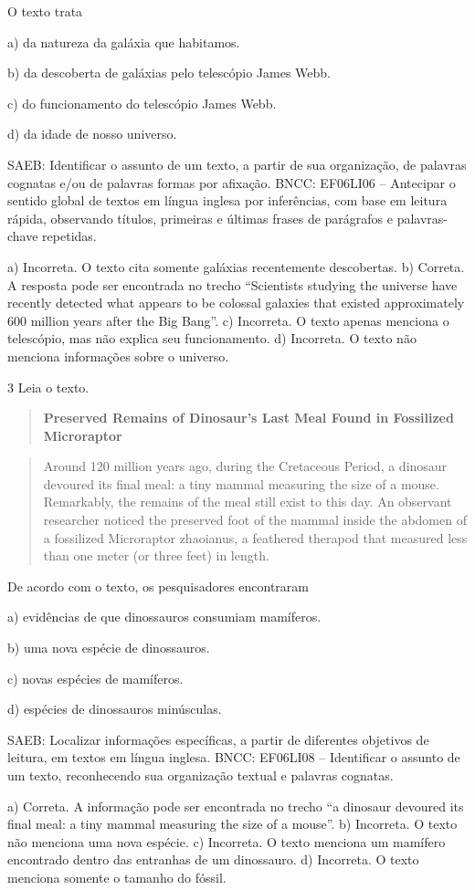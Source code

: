 O texto trata

a) da natureza da galáxia que habitamos.

b) da descoberta de galáxias pelo telescópio James Webb.

c) do funcionamento do telescópio James Webb.

d) da idade de nosso universo.

SAEB: Identificar o assunto de um texto, a partir de sua organização, de
palavras cognatas e/ou de palavras formas por afixação. BNCC: EF06LI06
-- Antecipar o sentido global de textos em língua inglesa por
inferências, com base em leitura rápida, observando títulos, primeiras e
últimas frases de parágrafos e palavras-chave repetidas.

a) Incorreta. O texto cita somente galáxias recentemente descobertas. b)
Correta. A resposta pode ser encontrada no trecho ``Scientists studying
the universe have recently detected what appears to be colossal galaxies
that existed approximately 600 million years after the Big Bang''. c)
Incorreta. O texto apenas menciona o telescópio, mas não explica seu
funcionamento. d) Incorreta. O texto não menciona informações sobre o
universo.

\num{3} Leia o texto.

\begin{quote}
\textbf{Preserved Remains of Dinosaur's Last Meal Found in Fossilized
Microraptor}
\end{quote}

\begin{quote}
Around 120 million years ago, during the Cretaceous Period, a dinosaur
devoured its final meal: a tiny mammal measuring the size of a mouse.
Remarkably, the remains of the meal still exist to this day. An
observant researcher noticed the preserved foot of the mammal inside the
abdomen of a fossilized Microraptor zhaoianus, a feathered therapod that
measured less than one meter (or three feet) in length.
\end{quote}


De acordo com o texto, os pesquisadores encontraram

a) evidências de que dinossauros consumiam mamíferos.

b) uma nova espécie de dinossauros.

c) novas espécies de mamíferos.

d) espécies de dinossauros minúsculas.

SAEB: Localizar informações específicas, a partir de diferentes
objetivos de leitura, em textos em língua inglesa. BNCC: EF06LI08 --
Identificar o assunto de um texto, reconhecendo sua organização textual
e palavras cognatas.

a) Correta. A informação pode ser encontrada no trecho ``a dinosaur
devoured its final meal: a tiny mammal measuring the size of a mouse''.
b) Incorreta. O texto não menciona uma nova espécie. c) Incorreta. O
texto menciona um mamífero encontrado dentro das entranhas de um
dinossauro. d) Incorreta. O texto menciona somente o tamanho do fóssil.

